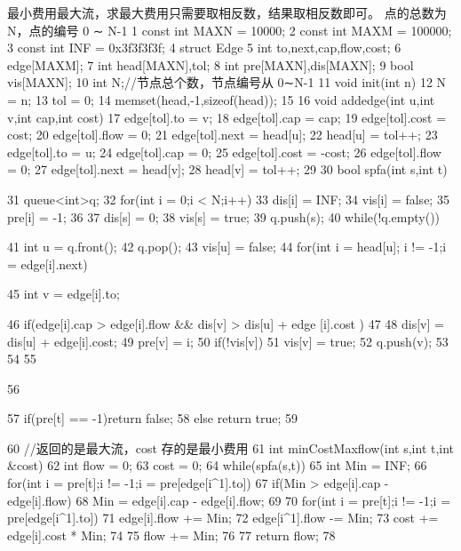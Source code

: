 \documentclass[11pt]{article}
\begin{document}
\begin{Code}
     最小费用最大流，求最大费用只需要取相反数，结果取相反数即可。
     点的总数为 N，点的编号 0 ∼ N-1
 1   const int MAXN = 10000;
 2   const int MAXM = 100000;
 3   const int INF = 0x3f3f3f3f;
 4   struct Edge{
 5       int to,next,cap,flow,cost;
 6   }edge[MAXM];
 7   int head[MAXN],tol;
 8   int pre[MAXN],dis[MAXN];
 9   bool vis[MAXN];
10   int N;//节点总个数，节点编号从 0∼N-1
11   void init(int n){
12       N = n;
13       tol = 0;
14       memset(head,-1,sizeof(head));
15   }
16   void addedge(int u,int v,int cap,int cost){
17       edge[tol].to = v;
18       edge[tol].cap = cap;
19       edge[tol].cost = cost;
20       edge[tol].flow = 0;
21       edge[tol].next = head[u];
22       head[u] = tol++;
23       edge[tol].to = u;
24       edge[tol].cap = 0;
25       edge[tol].cost = -cost;
26       edge[tol].flow = 0;
27       edge[tol].next = head[v];
28       head[v] = tol++;
29   }
30   bool spfa(int s,int t){
31       queue<int>q;
32       for(int i = 0;i < N;i++){
33           dis[i] = INF;
34           vis[i] = false;
35           pre[i] = -1;
36       }
37       dis[s] = 0;
38       vis[s] = true;
39       q.push(s);
40       while(!q.empty()){
41           int u = q.front();
42           q.pop();
43           vis[u] = false;
44           for(int i = head[u]; i != -1;i = edge[i].next){
45                int v = edge[i].to;


46               if(edge[i].cap > edge[i].flow && dis[v] > dis[u] + edge
                    [i].cost )
47               {
48                   dis[v] = dis[u] + edge[i].cost;
49                   pre[v] = i;
50                   if(!vis[v]){
51                       vis[v] = true;
52                       q.push(v);
53                   }
54               }
55           }
56       }
57       if(pre[t] == -1)return false;
58       else return true;
59   }
60   //返回的是最大流，cost 存的是最小费用
61   int minCostMaxflow(int s,int t,int &cost){
62       int flow = 0;
63       cost = 0;
64       while(spfa(s,t)){
65           int Min = INF;
66           for(int i = pre[t];i != -1;i = pre[edge[i^1].to]){
67               if(Min > edge[i].cap - edge[i].flow)
68                    Min = edge[i].cap - edge[i].flow;
69           }
70           for(int i = pre[t];i != -1;i = pre[edge[i^1].to]){
71               edge[i].flow += Min;
72               edge[i^1].flow -= Min;
73               cost += edge[i].cost * Min;
74           }
75           flow += Min;
76       }
77       return flow;
78   }
\end{Code}
\end{document}
